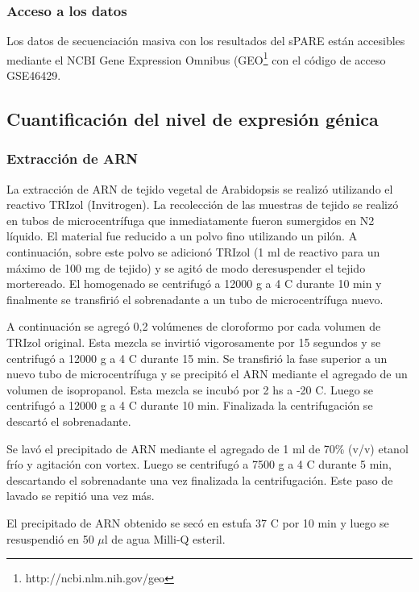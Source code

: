 \subsubsection{Acceso a los datos}
Los datos de secuenciación masiva con los resultados del sPARE están accesibles mediante el NCBI Gene Expression Omnibus (GEO\footnote{http://ncbi.nlm.nih.gov/geo} con el código de acceso GSE46429.



\subsection{Cuantificación del nivel de expresión génica}

\subsubsection{Extracción de ARN}
La extracción de ARN de tejido vegetal de Arabidopsis se realizó utilizando el reactivo TRIzol (Invitrogen).
La recolección de las muestras de tejido se realizó en tubos de microcentrífuga que inmediatamente fueron sumergidos en N2 líquido.
El material fue reducido a un polvo fino utilizando un pilón. A continuación, sobre este polvo se adicionó TRIzol (1 ml de reactivo para un máximo de 100 mg de tejido) y se agitó de modo deresuspender el tejido mortereado.
El homogenado se centrifugó a 12000 g a 4 \degree C durante 10 min y finalmente se transfirió el sobrenadante a un tubo de microcentrífuga nuevo.

A continuación se agregó 0,2 volúmenes de cloroformo por cada volumen de TRIzol original.
Esta mezcla se invirtió vigorosamente por 15 segundos y se centrifugó a 12000 g a 4 \degree C durante 15 min.
Se transfirió la fase superior a un nuevo tubo de microcentrífuga y se precipitó el ARN mediante el agregado de un volumen de isopropanol.
Esta mezcla se incubó por 2 hs a -20 \degree C. Luego se centrifugó a 12000 g a 4 \degree C durante 10 min.
Finalizada la centrifugación se descartó el sobrenadante.

Se lavó el precipitado de ARN mediante el agregado de 1 ml de 70\% (v/v) etanol frío y agitación con vortex.
Luego se centrifugó a 7500 g a 4 \degree C durante 5 min, descartando el sobrenadante una vez finalizada la centrifugación. 
Este paso de lavado se repitió una vez más.

El precipitado de ARN obtenido se secó en estufa 37 \degree C por 10 min y luego se resuspendió en 50 $\mu$l de agua Milli-Q esteril.

